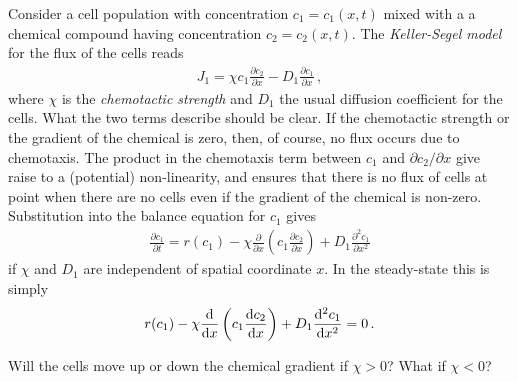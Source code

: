 Consider a cell population with concentration $c_1=c_1(x,t)$ mixed with a
a chemical compound having concentration $c_2=c_2(x,t)$. The \emph{Keller-Segel
model} for the flux of the cells reads
\begin{eqnarray}
	J_1 = \chi c_1 \frac{\partial c_2}{\partial x} - D_1 \frac{\partial c_1}{\partial x} \, ,
\end{eqnarray}
where $\chi$ is the \emph{chemotactic strength} and $D_1$ the usual diffusion 
coefficient for the cells. What the two terms describe should be clear. If the chemotactic strength 
or the gradient of the chemical is zero, then, of course, no flux occurs due to chemotaxis. 
The product in the chemotaxis term between $c_1$ and $\partial c_2/\partial x$ give raise to a 
(potential) non-linearity, and ensures that there is no flux of cells at point when there are no
cells even if the gradient of the chemical is non-zero. Substitution into the 
balance equation for $c_1$ gives 	
\begin{eqnarray}
	\frac{\partial c_1}{\partial t} = r(c_1) - \chi \frac{\partial}{\partial x} \left( c_1 \frac{\partial c_2}{\partial x} \right)
	+ D_1 \frac{\partial^2c_1}{\partial x^2} 
\end{eqnarray}
if $\chi$ and $D_1$ are independent of spatial coordinate $x$. In the
steady-state this is simply
\begin{eqnarray}
	r(c_1) -\chi \frac{\mathrm{d}}{\mathrm{d} x} \left( c_1 \frac{\mathrm{d} c_2}{\mathrm{d} x}\right) + D_1
	\frac{\mathrm{d} ^2 c_1}{\mathrm{d} x^2} = 0 \, . 
\end{eqnarray}

\begin{question}
	Will the cells move up or down the chemical gradient if $\chi > 0$? What if $\chi <
	0$?
\end{question}

